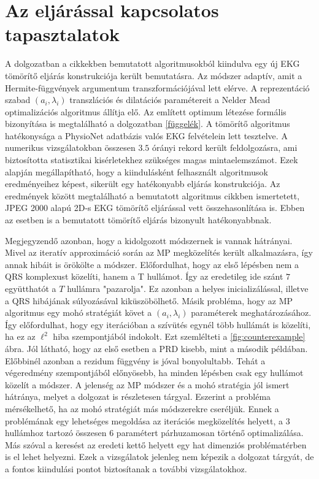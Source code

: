 \documentclass[oneside,titlepage,12pt,a4paper]{report}
\begin{document}
\section{Az eljárással kapcsolatos tapasztalatok}

A dolgozatban a \cite{hexp3, hexp5} cikkekben bemutatott algoritmusokból kiindulva egy új EKG tömörítő eljárás konstrukciója került bemutatásra. Az módszer adaptív, amit a Hermite-függvények argumentum transzformációjával lett elérve. A reprezentáció szabad $(a_i,\lambda_i)$ transzlációs és dilatációs paramétereit a Nelder Mead optimalizációs algoritmus állítja elő. Az említett optimum létezése formális bizonyítása is megtalálható a dolgozatban \ref{függelék}. A tömörítő algoritmus hatékonysága a PhysioNet adatbázis valós EKG felvételein lett tesztelve. A numerikus vizsgálatokban összesen $3.5$ órányi rekord került feldolgozásra, ami biztosította statisztikai kisérletekhez szükséges magas mintaelemszámot. Ezek alapján megállapítható, hogy a kiindulásként felhasznált \cite{hexp3, hexp5} algoritmusok eredményeihez képest, sikerült egy hatékonyabb eljárás konstrukciója. Az eredmények között megtalálható a bemutatott algoritmus \cite{jpeg2000ECG} cikkben ismertetett, JPEG 2000 alapú 2D-s EKG tömörítő eljárással vett összehasonlítása is. Ebben az esetben is a bemutatott tömörítő eljárás bizonyult hatékonyabbnak.

Megjegyzendő azonban, hogy a kidolgozott módszernek is vannak hátrányai. Mivel az iteratív approximáció során az MP megközelítés került alkalmazásra, így annak hibáit is örökölte a módszer. Előfordulhat, hogy az első lépésben nem a QRS komplexust közelíti, hanem a T hullámot. Így az eredetileg ide szánt $7$ együtthatót a $T$ hullámra "pazarolja". Ez azonban a helyes inicializálással, illetve a QRS hibájának súlyozásával kiküszöbölhető. Másik probléma, hogy az MP algoritmus egy mohó stratégiát követ a $(a_i,\lambda_i)$ paraméterek meghatározásához. Így előfordulhat, hogy egy iterációban a szívütés egynél több hullámát is közelíti, ha ez az $\ell^2$ hiba szempontjából indokolt. Ezt szemlélteti a \ref{fig:counterexample} ábra. Jól látható, hogy az első esetben a PRD kisebb, mint a második példában. Előbbinél azonban a rezidum függvény is jóval bonyolultabb. Tehát a végeredmény szempontjából előnyösebb, ha minden lépésben csak egy hullámot közelít a módszer. A jelenség az MP módszer és a mohó stratégia jól ismert hátránya, melyet a \cite{bpurs} dolgozat is részletesen tárgyal. Eszerint a probléma mérsékelhető, ha az mohó stratégiát más módszerekre cseréljük. Ennek a problémának egy lehetséges megoldása az iterációs megközelítés helyett, a $3$ hullámhoz tartozó összesen $6$ paramétert párhuzamosan történő optimalizálása. Más szóval a keresést az eredeti kettő helyett egy hat dimenziós problématérben is el lehet helyezni. Ezek a vizsgálatok jelenleg nem képezik a dolgozat tárgyát, de a fontos kiindulási pontot biztosítanak a további vizsgálatokhoz.
 
\end{document}

